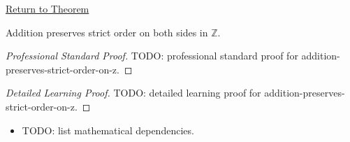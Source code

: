 \newpage
{}
\label{prf:addition-preserves-strict-order-on-z}

\begin{remark*}[Return]
\hyperref[thm:addition-preserves-strict-order-on-z]{Return to Theorem}
\end{remark*}

\begin{theorem*}
Addition preserves strict order on both sides in $\mathbb{Z}$.
\end{theorem*}

\begin{proof}[Professional Standard Proof]
\LRAProofBodyStart
TODO: professional standard proof for addition-preserves-strict-order-on-z.
\end{proof}

\begin{proof}[Detailed Learning Proof]
\LRAProofBodyStart
TODO: detailed learning proof for addition-preserves-strict-order-on-z.
\end{proof}

\begin{remark*}
\end{remark*}

\begin{dependencies}
\begin{itemize}
  \item TODO: list mathematical dependencies.
\end{itemize}
\end{dependencies}

\clearpage
